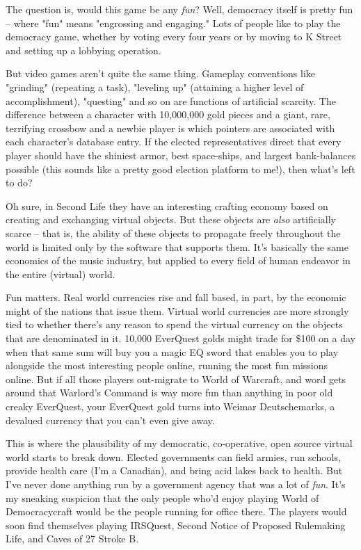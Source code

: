 The question is, would this game be any \emph{fun}? Well,
democracy itself is pretty fun -- where "fun" means "engrossing and
engaging." Lots of people like to play the democracy game, whether
by voting every four years or by moving to K Street and setting up
a lobbying operation.

But video games aren't quite the same thing. Gameplay conventions
like "grinding" (repeating a task), "leveling up" (attaining a
higher level of accomplishment), "questing" and so on are functions
of artificial scarcity. The difference between a character with
10,000,000 gold pieces and a giant, rare, terrifying crossbow and a
newbie player is which pointers are associated with each
character's database entry. If the elected representatives direct
that every player should have the shiniest armor, best space-ships,
and largest bank-balances possible (this sounds like a pretty good
election platform to me!), then what's left to do?

Oh sure, in Second Life they have an interesting crafting economy
based on creating and exchanging virtual objects. But these objects
are \emph{also} artificially scarce -- that is, the ability of
these objects to propagate freely throughout the world is limited
only by the software that supports them. It's basically the same
economics of the music industry, but applied to every field of
human endeavor in the entire (virtual) world.

Fun matters. Real world currencies rise and fall based, in part, by
the economic might of the nations that issue them. Virtual world
currencies are more strongly tied to whether there's any reason to
spend the virtual currency on the objects that are denominated in
it. 10,000 EverQuest golds might trade for \$100 on a day when that
same sum will buy you a magic EQ sword that enables you to play
alongside the most interesting people online, running the most fun
missions online. But if all those players out-migrate to World of
Warcraft, and word gets around that Warlord's Command is way more
fun than anything in poor old creaky EverQuest, your EverQuest gold
turns into Weimar Deutschemarks, a devalued currency that you can't
even give away.

This is where the plausibility of my democratic, co-operative, open
source virtual world starts to break down. Elected governments can
field armies, run schools, provide health care (I'm a Canadian),
and bring acid lakes back to health. But I've never done anything
run by a government agency that was a lot of \emph{fun}. It's my
sneaking suspicion that the only people who'd enjoy playing World
of Democracycraft would be the people running for office there. The
players would soon find themselves playing IRSQuest, Second Notice
of Proposed Rulemaking Life, and Caves of 27 Stroke B.

